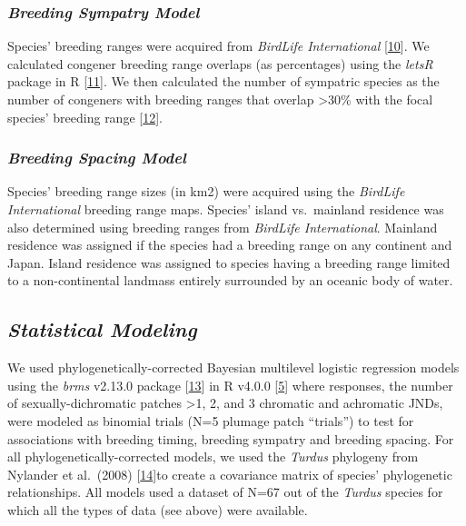 \documentclass[
  a4paper,
]{article}
\begin{document}
\hypertarget{breeding-sympatry-model}{%
\subsubsection{\texorpdfstring{\emph{Breeding Sympatry
Model}}{Breeding Sympatry Model}}\label{breeding-sympatry-model}}

Species' breeding ranges were acquired from \emph{BirdLife
International}
{[}\protect\hyperlink{ref-birdlifeinternationalandhandbookofthebirdsoftheworld2018}{10}{]}⁠.
We calculated congener breeding range overlaps (as percentages) using
the \emph{letsR} package in R
{[}\protect\hyperlink{ref-vilela2015}{11}{]}⁠. We then calculated the
number of sympatric species as the number of congeners with breeding
ranges that overlap \textgreater30\% with the focal species' breeding
range {[}\protect\hyperlink{ref-cooney2017}{12}{]}.

\hypertarget{breeding-spacing-model}{%
\subsubsection{\texorpdfstring{\emph{Breeding Spacing
Model}}{Breeding Spacing Model}}\label{breeding-spacing-model}}

Species' breeding range sizes (in km2) were acquired using the
\emph{BirdLife International} breeding range maps. Species' island
vs.~mainland residence was also determined using breeding ranges from
\emph{BirdLife International}. Mainland residence was assigned if the
species had a breeding range on any continent and Japan. Island
residence was assigned to species having a breeding range limited to a
non-continental landmass entirely surrounded by an oceanic body of
water.

\hypertarget{statistical-modeling}{%
\subsection{\texorpdfstring{\emph{Statistical
Modeling}}{Statistical Modeling}}\label{statistical-modeling}}

We used phylogenetically-corrected Bayesian multilevel logistic
regression models using the \emph{brms} v2.13.0 package
{[}\protect\hyperlink{ref-burkner2017}{13}{]} in R v4.0.0
{[}\protect\hyperlink{ref-rcoreteam2020}{5}{]}⁠ where responses, the
number of sexually-dichromatic patches \textgreater1, 2, and 3 chromatic
and achromatic JNDs, were modeled as binomial trials (N=5 plumage patch
``trials'') to test for associations with breeding timing, breeding
sympatry and breeding spacing. For all phylogenetically-corrected
models, we used the \emph{Turdus} phylogeny from Nylander et al.~(2008)
{[}\protect\hyperlink{ref-nylander2008}{14}{]}to create a covariance
matrix of species' phylogenetic relationships. All models used a dataset
of N=67 out of the \emph{Turdus} species for which all the types of data
(see above) were available.
\end{document}
